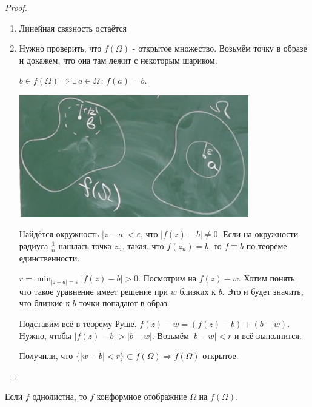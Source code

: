 \begin{proof}
    \begin{enumerate}
        \item {
            Линейная связность остаётся
        }
        \item {
            Нужно проверить, что $f(\Omega)$ - открытое множество. Возьмём точку
            в образе и докажем, что она там лежит с некоторым шариком.

            $b \in f(\Omega) \Rightarrow \exists \, a \in \Omega \, : \, f(a) = b$.


            \begin{center}
                \includegraphics[width=10cm]{assets/04-functions-of-complex-variables/single-leaf-theorem.png}
            \end{center}

            Найдётся окружность $|z - a| < \varepsilon$, что $|f(z) - b| \neq 0$. Если на окружности радиуса $\frac{1}{n}$ нашлась точка $z_n$,
            такая, что $f(z_n) = b$, то $f \equiv b$ по теореме единственности.

            $r = \min_{|z - a| = \varepsilon} |f(z) - b| > 0$. Посмотрим на $f(z) - w$. Хотим понять, что такое уравнение
            имеет решение при $w$ близких к $b$. Это и будет значить, что близкие к $b$ точки попадают в образ.

            Подставим всё в теорему Руше. $f(z) - w = (f(z) - b) + (b - w)$. Нужно, чтобы $|f(z) - b| > |b - w|$. Возьмём $|b-w| < r$ и всё выполнится.

            Получили, что $\{ |w-b| < r \} \subset f(\Omega) \Rightarrow f(\Omega)$ открытое.
        }
    \end{enumerate}
\end{proof}

\begin{consequence}
    Если $f$ однолистна, то $f$ конформное отображние $\Omega$ на $f(\Omega)$.
\end{consequence}

